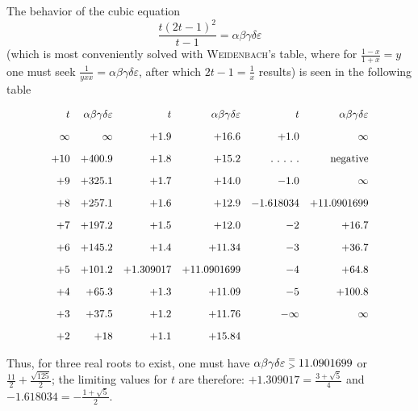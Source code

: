 The behavior of the cubic equation
\[
\frac{t(2t-1)^2}{t-1}=\alpha\beta\gamma\delta\varepsilon
\]
(which is most conveniently solved with \textsc{Weidenbach}'s table, where for
$\frac{1-x}{1+x}=y$
one must seek $\frac{1}{yxx}=\alpha\beta\gamma\delta\varepsilon$, after which
$2t-1=\frac1x$ results) is seen in the following table



\par\nopagebreak%
\begingroup\small\setlength{\arraycolsep}{2pt}\[
\resizebox{.84\linewidth}{!}{$\displaystyle \begin{array}{r@{\quad}r@{\quad}r@{\quad}r@{\quad}r@{\quad}r} t&\alpha\beta\gamma\delta\varepsilon&t&\alpha\beta\gamma\delta\varepsilon&t&\alpha\beta\gamma\delta\varepsilon\\[9pt] \infty&\infty&+1.9&+16.6&+1.0&\infty\\[9pt] +10&+400.9&+1.8&+15.2&\mathord{.}\ \mathord{.}\ \mathord{.}\ \mathord{.}\ \mathord{.}&\text{negative}\\[9pt] +9&+325.1&+1.7&+14.0&-1.0&\infty\\[9pt] +8&+257.1&+1.6&+12.9&-1.618034&+11.0901699\\[9pt] +7&+197.2&+1.5&+12.0&-2&+16.7\\[9pt] +6&+145.2&+1.4&+11.34&-3&+36.7\\[9pt] +5&+101.2&+1.309017&+11.0901699&-4&+64.8\\[9pt] +4&+65.3&+1.3&+11.09&-5&+100.8\\[9pt] +3&+37.5&+1.2&+11.76&-\infty&\infty\\[9pt] +2&+18&+1.1&+15.84&& \end{array}$}
\]\endgroup\par%



Thus, for three real roots to exist, one must have
$\alpha\beta\gamma\delta\varepsilon\mathrel{\substack{=\\>}}11.0901699$
or $\frac{11}{2}+\frac{\surd{125}}{2}$; the limiting values for $t$ are therefore:
$+1.309017=\frac{3+\surd5}{4}$ and $-1.618034=-\frac{1+\surd5}{2}$.

\clearpage
\endgroup

